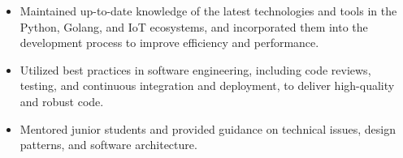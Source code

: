 {\begin{itemize}
                  delivering a comprehensive and insightful dashboard for data analysis and decision-making.
            \item Maintained up-to-date knowledge of the latest technologies and tools in the Python,
                  Golang, and IoT ecosystems, and incorporated them into the development process to improve efficiency and performance.
            \item Utilized best practices in software engineering, including code reviews, testing, and continuous
                  integration and deployment, to deliver high-quality and robust code.
            \item Mentored junior students and provided guidance on technical issues,
                  design patterns, and software architecture.
      \end{itemize}
}

